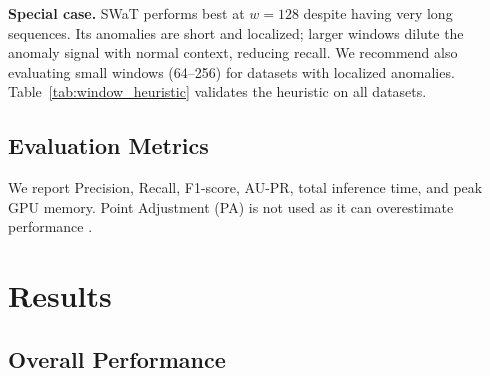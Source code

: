 \documentclass[runningheads]{llncs}
\begin{document}
\textbf{Special case.} SWaT performs best at $w=128$ despite having very long sequences. Its anomalies are short and localized; larger windows dilute the anomaly signal with normal context, reducing recall. We recommend also evaluating small windows (64--256) for datasets with localized anomalies. Table~\ref{tab:window_heuristic} validates the heuristic on all datasets.

\begin{table}[htbp]
\centering
\caption{Validation of the proposed window size heuristic.}
\label{tab:window_heuristic}
\end{table}

\subsection{Evaluation Metrics}

We report Precision, Recall, F1-score, AU-PR, total inference time, and peak GPU memory. Point Adjustment (PA) is not used as it can overestimate performance \cite{kim2022towards}.

\section{Results}
\label{sec:results}

\subsection{Overall Performance}
\end{document}
